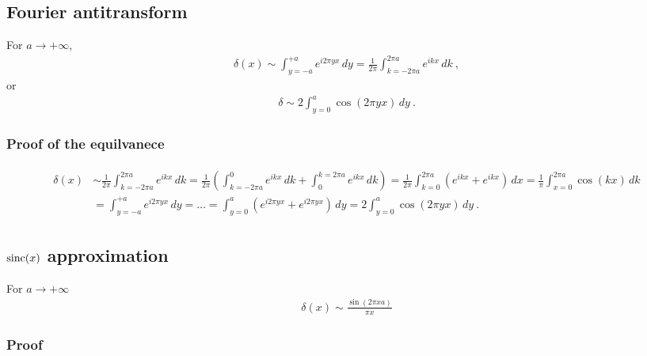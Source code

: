 \documentclass[letterpaper,10pt,english]{jupyterBook}
\begin{document}
\subsection{Fourier anti\sphinxhyphen{}transform}
\label{\detokenize{ch/functional-analysis/dirac-delta:fourier-anti-transform}}\label{\detokenize{ch/functional-analysis/dirac-delta:functional-analysis-dirac-delta-approximations-fourier-transform}}
\sphinxAtStartPar
For \(a \rightarrow + \infty\),
\begin{equation}\label{equation:ch/functional-analysis/dirac-delta:eq:dirac:fourier-transform}
\begin{split}\delta(x) \sim  \int_{y=-a}^{+a} e^{i 2 \pi y x} \, dy = \frac{1}{2 \pi} \int_{k=-2\pi a}^{2 \pi a} e^{i k x} \, dk \ ,\end{split}
\end{equation}
\sphinxAtStartPar
or
\begin{equation*}
\begin{split}\delta \sim 2 \int_{y=0}^{a} \cos(2 \pi y x) \, dy \ .\end{split}
\end{equation*}\subsubsection*{Proof of the equilvanece}
\begin{equation*}
\begin{split}\begin{aligned}
  \delta(x)
  & \sim \frac{1}{2 \pi} \int_{k=-2\pi a}^{2 \pi a} e^{i k x} \, dk = \frac{1}{2 \pi} \left( \int_{k=-2\pi a}^{0} e^{i k x} \, dk +  \int_{0}^{k=2\pi a} e^{i k x} \, dk \right) = \frac{1}{2 \pi} \int_{k = 0}^{2 \pi a} \left( e^{ikx} + e^{ikx} \right) \, dx = \frac{1}{\pi} \int_{x=0}^{2 \pi a} \cos(k x) \, dk \\
  & = \int_{y=-a}^{+a} e^{i 2 \pi y x} \, dy = \dots = \int_{y = 0}^{a} (e^{i 2 \pi y x} + e^{i 2 \pi y x}) \, dy = 2 \int_{y=0}^{a} \cos(2 \pi y x) \, dy \ .
\end{aligned}\end{split}
\end{equation*}

\subsection{\protect\(\text{sinc}(x)\protect\) approximation}
\label{\detokenize{ch/functional-analysis/dirac-delta:text-sinc-x-approximation}}\label{\detokenize{ch/functional-analysis/dirac-delta:id1}}
\sphinxAtStartPar
For \(a \rightarrow +\infty\)
\begin{equation*}
\begin{split}\delta(x) \sim \frac{\sin(2 \pi x a)}{\pi x}\end{split}
\end{equation*}\subsubsection*{Proof}
\end{document}
